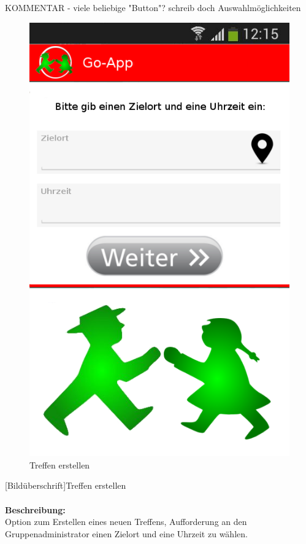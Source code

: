 KOMMENTAR
- viele beliebige "Button"? schreib doch Auswahlmöglichkeiten


\begin{figure} [H]
	\caption{Treffen erstellen}
\begin{center}
	\includegraphics[scale =0.5]{resources/images/treffpunkt_erstellen.png}
\end{center}
\end{figure}
[Bildüberschrift]Treffen erstellen \\ \\
\textbf{Beschreibung:}\\
Option zum Erstellen eines neuen Treffens, Aufforderung an den Gruppenadministrator einen Zielort und eine Uhrzeit zu wählen.\\

